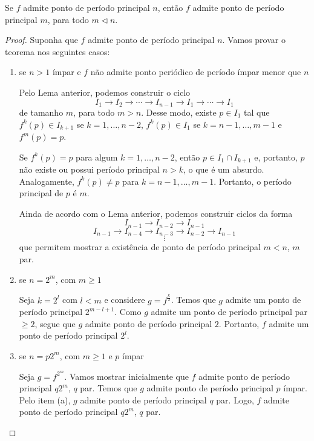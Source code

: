 \begin{theorem}
Se $f$ admite ponto de período principal $n$, então $f$ admite ponto de período principal $m$, para todo $m \triangleleft n$.
\end{theorem}

\begin{proof}
Suponha que $f$ admite ponto de período principal $n$. Vamos provar o teorema nos seguintes casos:
\begin{enumerate}[label = (\alph*)]
\item se $n > 1$ ímpar e $f$ não admite ponto periódico de período ímpar menor que $n$

Pelo Lema anterior,  podemos construir o ciclo $$I_1 \longrightarrow I_2 \longrightarrow \cdots \longrightarrow I_{n-1} \longrightarrow I_1 \longrightarrow \cdots \longrightarrow I_1$$ de tamanho $m$, para todo $m > n$. Desse modo, existe $p \in I_1$ tal que $f^k(p) \in I_{k+1}$ se $k = 1, \dots, n-2$, $f^k(p) \in I_1$ se $k = n-1, \dots, m-1$ e $f^m(p) = p$.

Se $f^k(p) = p$ para algum $k = 1, \dots, n-2$, então $p \in I_1 \cap I_{k+1}$ e, portanto, $p$ não existe ou possui período principal $n > k$, o que é um absurdo. Analogamente, $f^k(p) \neq p$ para $k = n-1, \dots, m-1$. Portanto, o período principal de $p$ é $m$.

Ainda de acordo com o Lema anterior, podemos construir ciclos da forma
$$I_{n-1} \longrightarrow I_{n-2} \longrightarrow I_{n-1}$$
$$I_{n-1} \longrightarrow I_{n-4} \longrightarrow I_{n-3} \longrightarrow I_{n-2} \longrightarrow I_{n-1}$$
$$\vdots$$
que permitem mostrar a existência de ponto de período principal $m < n$, $m$ par.
\item se $n = 2^m$, com $m \geq 1$

Seja $k = 2^l$ com $l < m$ e considere $g = f^\frac{k}{2}$. Temos que $g$ admite um ponto de período principal $2^{m-l+1}$. Como $g$ admite um ponto de período principal par $\geq 2$, segue que $g$ admite ponto de período principal $2$. Portanto, $f$ admite um ponto de período principal $2^l$.

\item se $n = p 2^m$, com $m \geq 1$ e $p$ ímpar

Seja $g = f^{2^m}$. Vamos mostrar inicialmente que $f$ admite ponto de período principal $q2^m$, $q$ par. Temos que $g$ admite ponto de período principal $p$ ímpar. Pelo item (a), $g$ admite ponto de período principal $q$ par. Logo, $f$ admite ponto de período principal $q2^m$, $q$ par.


\end{enumerate}
\end{proof}
